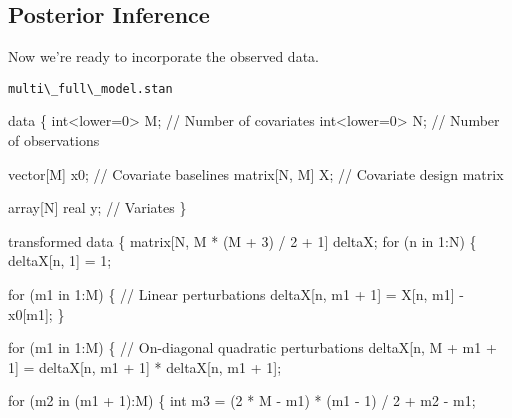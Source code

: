 \documentclass[
  letterpaper,
  DIV=11,
  numbers=noendperiod]{scrartcl}
\newenvironment{Shaded}{\begin{snugshade}}{\end{snugshade}}
\newcommand{\CommentTok}[1]{\textcolor[rgb]{0.37,0.37,0.37}{#1}}
\newcommand{\ControlFlowTok}[1]{\textcolor[rgb]{0.00,0.23,0.31}{#1}}
\newcommand{\DataTypeTok}[1]{\textcolor[rgb]{0.68,0.00,0.00}{#1}}
\newcommand{\DecValTok}[1]{\textcolor[rgb]{0.68,0.00,0.00}{#1}}
\newcommand{\KeywordTok}[1]{\textcolor[rgb]{0.00,0.23,0.31}{#1}}
\newcommand{\NormalTok}[1]{\textcolor[rgb]{0.00,0.23,0.31}{#1}}
\begin{document}
\subsection{Posterior Inference}\label{posterior-inference-1}

Now we're ready to incorporate the observed data.

\begin{codelisting}

\caption{\texttt{multi\textbackslash\_full\textbackslash\_model.stan}}

\begin{Shaded}
\begin{Highlighting}[]
\KeywordTok{data}\NormalTok{ \{}
  \DataTypeTok{int}\NormalTok{\textless{}}\KeywordTok{lower}\NormalTok{=}\DecValTok{0}\NormalTok{\textgreater{} M;  }\CommentTok{// Number of covariates}
  \DataTypeTok{int}\NormalTok{\textless{}}\KeywordTok{lower}\NormalTok{=}\DecValTok{0}\NormalTok{\textgreater{} N;  }\CommentTok{// Number of observations}
  
  \DataTypeTok{vector}\NormalTok{[M] x0;    }\CommentTok{// Covariate baselines}
  \DataTypeTok{matrix}\NormalTok{[N, M] X;  }\CommentTok{// Covariate design matrix}
  
  \DataTypeTok{array}\NormalTok{[N] }\DataTypeTok{real}\NormalTok{ y; }\CommentTok{// Variates}
\NormalTok{\}}

\KeywordTok{transformed data}\NormalTok{ \{}
  \DataTypeTok{matrix}\NormalTok{[N, M * (M + }\DecValTok{3}\NormalTok{) / }\DecValTok{2}\NormalTok{ + }\DecValTok{1}\NormalTok{] deltaX;}
  \ControlFlowTok{for}\NormalTok{ (n }\ControlFlowTok{in} \DecValTok{1}\NormalTok{:N) \{}
\NormalTok{    deltaX[n, }\DecValTok{1}\NormalTok{] = }\DecValTok{1}\NormalTok{;}
    
    \ControlFlowTok{for}\NormalTok{ (m1 }\ControlFlowTok{in} \DecValTok{1}\NormalTok{:M) \{}
      \CommentTok{// Linear perturbations}
\NormalTok{      deltaX[n, m1 + }\DecValTok{1}\NormalTok{] = X[n, m1] {-} x0[m1];}
\NormalTok{    \}}
    
    \ControlFlowTok{for}\NormalTok{ (m1 }\ControlFlowTok{in} \DecValTok{1}\NormalTok{:M) \{}
      \CommentTok{// On{-}diagonal quadratic perturbations}
\NormalTok{      deltaX[n, M + m1 + }\DecValTok{1}\NormalTok{] }
\NormalTok{        = deltaX[n, m1 + }\DecValTok{1}\NormalTok{] * deltaX[n, m1 + }\DecValTok{1}\NormalTok{];}
  
      \ControlFlowTok{for}\NormalTok{ (m2 }\ControlFlowTok{in}\NormalTok{ (m1 + }\DecValTok{1}\NormalTok{):M) \{}
        \DataTypeTok{int}\NormalTok{ m3 = (}\DecValTok{2}\NormalTok{ * M {-} m1) * (m1 {-} }\DecValTok{1}\NormalTok{) / }\DecValTok{2}\NormalTok{ + m2 {-} m1;}
          

\end{Highlighting}
\end{Shaded}
\end{codelisting}
\end{document}

